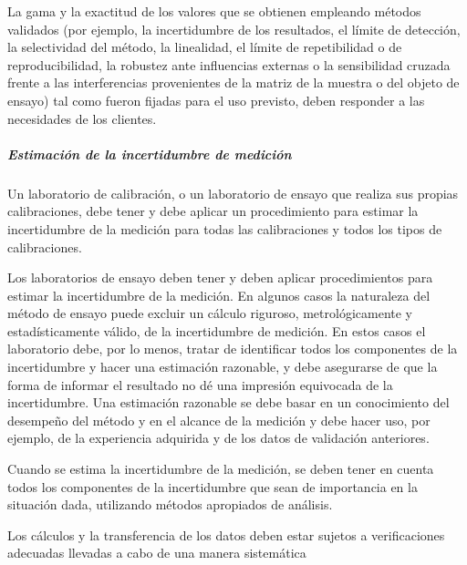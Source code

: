 				\par \noindent
					La gama y la exactitud de los valores que se obtienen empleando métodos validados (por
					ejemplo, la incertidumbre de los resultados, el límite de detección, la selectividad del método, la linealidad, el
					límite de repetibilidad o de reproducibilidad, la robustez ante influencias externas o la sensibilidad cruzada
					frente a las interferencias provenientes de la matriz de la muestra o del objeto de ensayo) tal como fueron
					fijadas para el uso previsto, deben responder a las necesidades de los clientes.
					
			\subparagraph{Estimación de la incertidumbre de medición}
				\par 
					Un laboratorio de calibración, o un laboratorio de ensayo que realiza sus propias calibraciones,
					debe tener y debe aplicar un procedimiento para estimar la incertidumbre de la medición para todas las
					calibraciones y todos los tipos de calibraciones.
		
\newpage
\thispagestyle{plain}
					
				\par \noindent
					Los laboratorios de ensayo deben tener y deben aplicar procedimientos para estimar la
					incertidumbre de la medición. En algunos casos la naturaleza del método de ensayo puede excluir un cálculo
					riguroso, metrológicamente y estadísticamente válido, de la incertidumbre de medición. En estos casos el
					laboratorio debe, por lo menos, tratar de identificar todos los componentes de la incertidumbre y hacer una
					estimación razonable, y debe asegurarse de que la forma de informar el resultado no dé una impresión
					equivocada de la incertidumbre. Una estimación razonable se debe basar en un conocimiento del desempeño
					del método y en el alcance de la medición y debe hacer uso, por ejemplo, de la experiencia adquirida y de los
					datos de validación anteriores.
					
				\par \noindent
					Cuando se estima la incertidumbre de la medición, se deben tener en cuenta todos los
					componentes de la incertidumbre que sean de importancia en la situación dada, utilizando métodos
					apropiados de análisis.
					
				\par \noindent
					Los cálculos y la transferencia de los datos deben estar sujetos a verificaciones adecuadas
					llevadas a cabo de una manera sistemática
					
